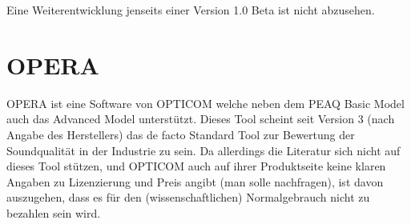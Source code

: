 Eine Weiterentwicklung jenseits einer Version 1.0 Beta ist nicht abzusehen. 

\section{OPERA}

OPERA ist eine Software von OPTICOM welche neben dem PEAQ Basic Model auch das Advanced Model unterstützt. Dieses Tool scheint seit Version 3 (nach Angabe des Herstellers) das de facto Standard Tool zur Bewertung der Soundqualität in der Industrie zu sein. Da allerdings die Literatur sich nicht auf dieses Tool stützen, und OPTICOM auch auf ihrer Produktseite keine klaren Angaben zu Lizenzierung und Preis angibt (man solle nachfragen), ist davon auszugehen, dass es für den (wissenschaftlichen) \glqq{}Normalgebrauch\grqq{} nicht zu bezahlen sein wird.



